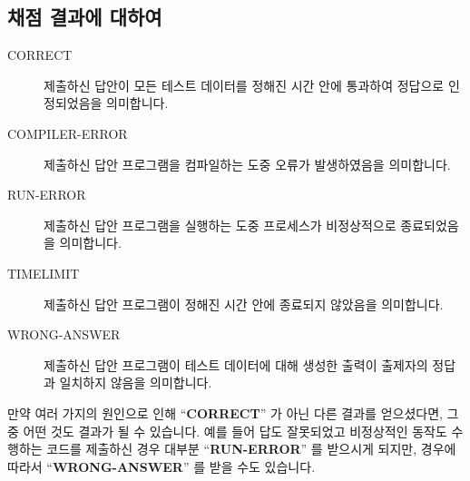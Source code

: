 \subsection*{채점 결과에 대하여}

\begin{description}
\item[CORRECT] 제출하신 답안이 모든 테스트 데이터를 정해진 시간 안에 통과하여 정답으로 인정되었음을 의미합니다.
\item[COMPILER-ERROR] 제출하신 답안 프로그램을 컴파일하는 도중 오류가 발생하였음을 의미합니다.
\item[RUN-ERROR] 제출하신 답안 프로그램을 실행하는 도중 프로세스가 비정상적으로 종료되었음을 의미합니다.
\item[TIMELIMIT] 제출하신 답안 프로그램이 정해진 시간 안에 종료되지 않았음을 의미합니다.
\item[WRONG-ANSWER] 제출하신 답안 프로그램이 테스트 데이터에 대해 생성한 출력이 출제자의 정답과 일치하지 않음을 의미합니다.
\end{description}

만약 여러 가지의 원인으로 인해 ``\textbf{CORRECT}'' 가 아닌 다른 결과를 얻으셨다면, 그 중 어떤 것도 결과가 될 수 있습니다.
예를 들어 답도 잘못되었고 비정상적인 동작도 수행하는 코드를 제출하신 경우 대부분 ``\textbf{RUN-ERROR}'' 를 받으시게 되지만, 경우에 따라서 ``\textbf{WRONG-ANSWER}'' 를 받을 수도 있습니다.

\clearpage
